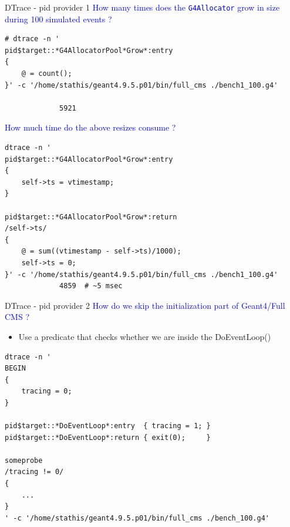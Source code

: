 \documentclass{beamer}
\begin{document}

\begin{frame}[fragile]{DTrace - pid provider 1}
\textcolor{blue}{How many times does the {\tt G4Allocator} grow in size during 100 simulated events ?}

\lstset{frame=single, columns=flexible}
\lstset{basicstyle=\tiny\ttfamily}
\begin{lstlisting}
# dtrace -n '
pid$target::*G4AllocatorPool*Grow*:entry
{
    @ = count();
}' -c '/home/stathis/geant4.9.5.p01/bin/full_cms ./bench1_100.g4'

             5921
\end{lstlisting}

\textcolor{blue}{How much time do the above resizes consume ?}

\lstset{frame=single, columns=flexible}
\lstset{basicstyle=\tiny\ttfamily}
\begin{lstlisting}
dtrace -n '
pid$target::*G4AllocatorPool*Grow*:entry
{
    self->ts = vtimestamp;
}

pid$target::*G4AllocatorPool*Grow*:return
/self->ts/
{
    @ = sum((vtimestamp - self->ts)/1000);
    self->ts = 0;
}' -c '/home/stathis/geant4.9.5.p01/bin/full_cms ./bench1_100.g4'
             4859  # ~5 msec
\end{lstlisting}
\end{frame}

\begin{frame}[fragile]{DTrace - pid provider 2}
\textcolor{blue}{How do we skip the initialization part of Geant4/Full CMS ?}
\begin{itemize}
\item Use a predicate that checks whether we are inside the DoEventLoop()
\end{itemize}

\lstset{frame=single, columns=flexible}
\lstset{basicstyle=\tiny\ttfamily}
\begin{lstlisting}
dtrace -n '
BEGIN
{
    tracing = 0;
}

pid$target::*DoEventLoop*:entry  { tracing = 1; }
pid$target::*DoEventLoop*:return { exit(0);     }

someprobe
/tracing != 0/
{
    ...
}
' -c '/home/stathis/geant4.9.5.p01/bin/full_cms ./bench_100.g4'
\end{lstlisting}

\end{frame}
\end{document}
